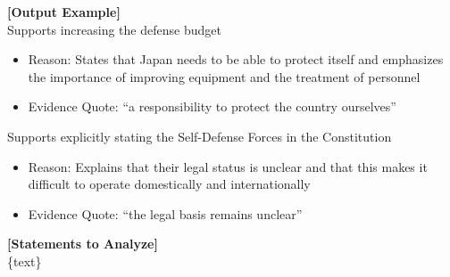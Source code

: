 \documentclass[11pt,letterpaper]{article}
\theoremstyle{plain}
\begin{document}
\begin{tcolorbox}[colback=gray!5!white,colframe=gray!75!black,title=Method: Summarization Prompt (Translated), breakable]
\textbf{[Output Example]} \\
Supports increasing the defense budget
\begin{itemize}
    \item Reason: States that Japan needs to be able to protect itself and emphasizes the importance of improving equipment and the treatment of personnel
    \item Evidence Quote: ``a responsibility to protect the country ourselves''
\end{itemize}
Supports explicitly stating the Self-Defense Forces in the Constitution
\begin{itemize}
    \item Reason: Explains that their legal status is unclear and that this makes it difficult to operate domestically and internationally
    \item Evidence Quote: ``the legal basis remains unclear''
\end{itemize}

\textbf{[Statements to Analyze]} \\
\{text\}
\end{tcolorbox}
\end{document}
